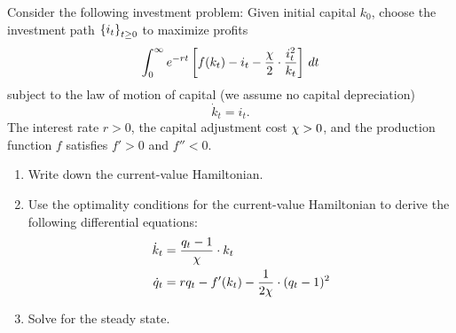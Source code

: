 \documentclass[letterpaper, 11pt, leqno]{article}
\begin{document}
Consider the following investment problem: Given initial capital $k_{0}$, choose the investment path $\left\lbrace i_{t} \right\rbrace _{t \ge 0}$ to maximize profits
\begin{equation*}
\int_{0}^{\infty}e^{-r t}\left[ f(k_{t})-i_{t}-\frac{\chi}{2}\cdot\frac{i_{t}^{2}}{k_{t}} \right]\,dt 
\end{equation*}
subject to the law of motion of capital (we assume no capital depreciation)
\begin{equation*}
\dot{k}_{t} =i_{t}.
\end{equation*}
The interest rate $r>0$, the capital adjustment cost $\chi>0$, and the production function $f$ satisfies $f'>0$ and $f''<0$.
\begin{enumerate}
\item Write down the current-value Hamiltonian. 
\item Use the optimality conditions for the current-value Hamiltonian to derive the following differential equations:
\begin{align*}
\dot{k}_{t} &=\frac{q_{t}-1}{\chi} \cdot k_{t} \\
\dot{q}_{t} &=r q_{t}-f'(k_{t}) -\frac{1}{2 \chi} \cdot (q_{t}-1)^{2}
\end{align*}
\item Solve for the steady state.
\end{enumerate}
\end{document}
